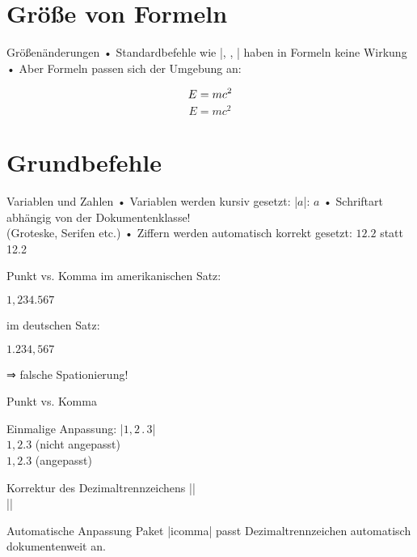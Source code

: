 \section{Größe von Formeln}
\begin{frame}[fragile]{Größenänderungen}
• Standardbefehle wie |\small, \tiny, \Huge| haben in Formeln keine Wirkung
• Aber Formeln passen sich der Umgebung an:
\• 
\begin{LTXexample}[pos=b]
\small\[E = \Huge mc^2\]
\Huge\[E = mc^2\]
\end{LTXexample}
\end{frame}

\section{Grundbefehle}
\begin{frame}[fragile]{Variablen und Zahlen}
• Variablen werden kursiv gesetzt: |$a$|: $a$
• Schriftart abhängig von der Dokumentenklasse!\\%
(Groteske, Serifen etc.)
• Ziffern werden automatisch korrekt gesetzt: $12.2$ statt 12.2
\•
\end{frame}

\begin{frame}[fragile]{Punkt vs. Komma}
im amerikanischen Satz:
\begin{LTXexample}[preset=\huge]
$1,234.567$
\end{LTXexample}\pause
im deutschen Satz:
\begin{LTXexample}[preset=\huge]
$1.234,567$
\end{LTXexample}
\alert{⇒ falsche Spationierung!}
\end{frame}
\begin{frame}[fragile]{Punkt vs. Komma}
\begin{block}{Einmalige Anpassung:}
\Large|$1{,}2\mathpunct{.}3$|\\
$1,2.3$ \normalsize (nicht angepasst)\\
\Large $1{,}2\mathord{.}3$ \normalsize(angepasst)
\end{block}
\pause
\begin{block}{Korrektur des Dezimaltrennzeichens}
||\\
||
\end{block}
\pause
\begin{block}{Automatische Anpassung}
Paket |icomma| passt Dezimaltrennzeichen automatisch dokumentenweit an.
\end{block}
\end{frame}

